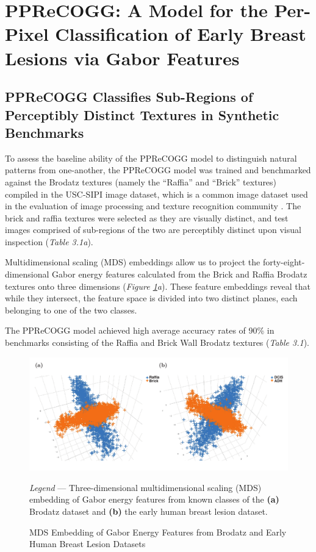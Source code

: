 \section{PPReCOGG: A Model for the Per-Pixel Classification of Early Breast Lesions via Gabor Features}

\subsection{PPReCOGG Classifies Sub-Regions of Perceptibly Distinct Textures in Synthetic Benchmarks}

To assess the baseline ability of the PPReCOGG model to distinguish natural patterns from one-another, the PPReCOGG model was trained and benchmarked against the Brodatz textures (namely the ``Raffia'' and ``Brick'' textures) compiled in the USC-SIPI image dataset, which is a common image dataset used in the evaluation of image processing and texture recognition community \citep{weber1997}. The brick and raffia textures were selected as they are visually distinct, and test images comprised of sub-regions of the two are perceptibly distinct upon visual inspection (\emph{Table 3.1a}).\par

Multidimensional scaling (MDS) embeddings allow us to project the forty-eight-dimensional Gabor energy features calculated from the Brick and Raffia Brodatz textures onto three dimensions (\emph{Figure \ref{embeddings}a}). These feature embeddings reveal that while they intersect, the feature space is divided into two distinct planes, each belonging to one of the two classes.

The PPReCOGG model achieved high average accuracy rates of 90\% in benchmarks consisting of the Raffia and Brick Wall Brodatz textures (\emph{Table 3.1}).\par


\begin{figure}[p]
	\begin{center}
	\caption{MDS Embedding of Gabor Energy Features from Brodatz and Early Human Breast Lesion Datasets \label{embeddings}}
	\end{center}
	\includegraphics[width=170mm]{figures/embeddings/figure.pdf}
	 \begin{singlespace}
	 	\textit{Legend} --- Three-dimensional multidimensional scaling (MDS) embedding of Gabor energy features from known classes of the \textbf{(a)} Brodatz dataset and \textbf{(b)} the early human breast lesion dataset.
	 \end{singlespace}
	
\end{figure}



